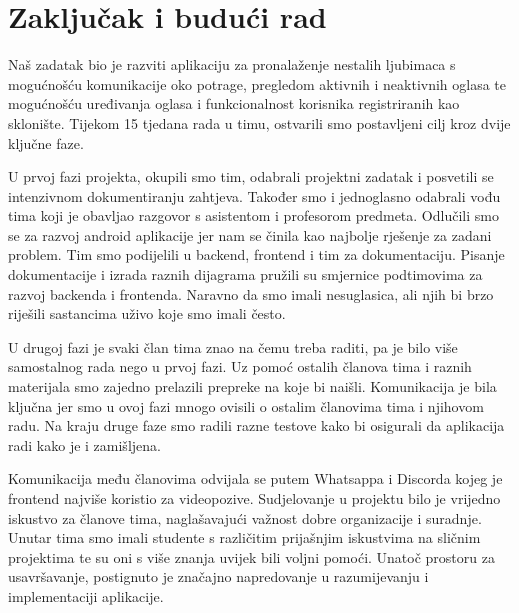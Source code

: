 \chapter{Zaključak i budući rad}
		
		
		Naš zadatak bio je razviti aplikaciju za pronalaženje nestalih ljubimaca s mogućnošću komunikacije oko potrage, pregledom aktivnih i neaktivnih oglasa te mogućnošću uređivanja oglasa i funkcionalnost korisnika registriranih kao sklonište. Tijekom 15 tjedana rada u timu, ostvarili smo postavljeni cilj kroz dvije ključne faze.
		
		U prvoj fazi projekta, okupili smo tim, odabrali projektni zadatak i posvetili se intenzivnom dokumentiranju zahtjeva. Također smo i jednoglasno odabrali vođu tima koji je obavljao razgovor s asistentom i profesorom predmeta. Odlučili smo se za razvoj android aplikacije jer nam se činila kao najbolje rješenje za zadani problem. Tim smo podijelili u backend, frontend i tim za dokumentaciju. Pisanje dokumentacije i izrada raznih dijagrama pružili su smjernice podtimovima za razvoj backenda i frontenda. Naravno da smo imali nesuglasica, ali njih bi brzo riješili sastancima uživo koje smo imali često.
		
		U drugoj fazi je svaki član tima znao na čemu treba raditi, pa je bilo više samostalnog rada nego u prvoj fazi. Uz pomoć ostalih članova tima i raznih materijala smo zajedno prelazili prepreke na koje bi naišli. Komunikacija je bila ključna jer smo u ovoj fazi mnogo ovisili o ostalim članovima tima i njihovom radu. Na kraju druge faze smo radili razne testove kako bi osigurali da aplikacija radi kako je i zamišljena.
		
		Komunikacija među članovima odvijala se putem Whatsappa i Discorda kojeg je frontend najviše koristio za videopozive. Sudjelovanje u projektu bilo je vrijedno iskustvo za članove tima, naglašavajući važnost dobre organizacije i suradnje. Unutar tima smo imali studente s različitim prijašnjim iskustvima na sličnim projektima te su oni s više znanja uvijek bili voljni pomoći. Unatoč prostoru za usavršavanje, postignuto je značajno napredovanje u razumijevanju i implementaciji aplikacije.
		
		\eject 